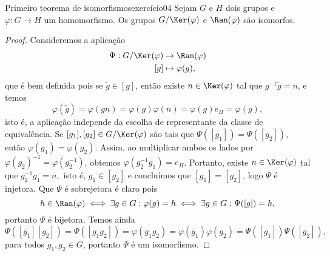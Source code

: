 \begin{proposition}{Primeiro teorema de isomorfismos}{exercício04}
    Sejam \(G\) e \(H\) dois grupos e \(\varphi : G \to H\) um homomorfismo. Os grupos \(G/\Ker(\varphi)\) e \(\Ran(\varphi)\) são isomorfos.
\end{proposition}
\begin{proof}
    Consideremos a aplicação
    \begin{align*}
        \Psi : G/\Ker(\varphi) &\to \Ran(\varphi)\\
                           [g] &\mapsto \varphi(g),
    \end{align*}
    que é bem definida pois se \(\tilde{g} \in [g]\), então existe \(n \in \Ker(\varphi)\) tal que \(g^{-1}\tilde{g} = n\), e temos
    \begin{equation*}
        \varphi(\tilde{g}) = \varphi(gn) = \varphi(g)\varphi(n) = \varphi(g)e_H = \varphi(g),
    \end{equation*}
    isto é, a aplicação independe da escolha de representante da classe de equivalência. Se \([g_1], [g_2] \in G/\Ker(\varphi)\) são tais que \(\Psi([g_1]) = \Psi([g_2])\), então \(\varphi(g_1) = \varphi(g_2)\). Assim, ao multiplicar ambos os lados por \(\varphi(g_2)^{-1} = \varphi(g_2^{-1})\), obtemos \(\varphi(g_2^{-1}g_1) = e_H\). Portanto, existe \(n \in \Ker(\varphi)\) tal que \(g_2^{-1}g_1 = n,\) isto é, \(g_1 \in [g_2]\) e concluímos que \([g_1] = [g_2]\), logo \(\Psi\) é injetora. Que \(\Psi\) é sobrejetora é claro pois
    \begin{equation*}
        h \in \Ran(\varphi) \iff \exists g \in G : \varphi(g) = h \iff \exists g \in G : \Psi([g]) = h,
    \end{equation*}
    portanto \(\Psi\) é bijetora. Temos ainda
    \begin{equation*}
        \Psi([g_1][g_2]) = \Psi([g_1g_2]) = \varphi(g_1g_2) = \varphi(g_1)\varphi(g_2) = \Psi([g_1])\Psi([g_2]),
    \end{equation*}
    para todos \(g_1, g_2 \in G\), portanto \(\Psi\) é um isomorfismo.
\end{proof}

